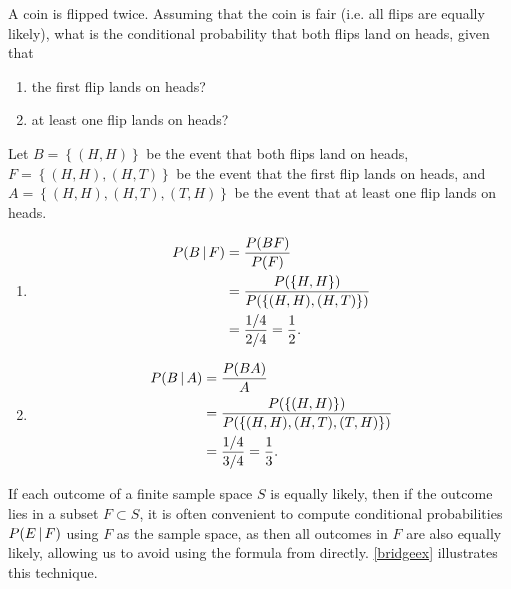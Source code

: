 \begin{changebar}
\begin{example}
    A coin is flipped twice. Assuming that the coin is fair (i.e. all flips are equally likely), what is the conditional probability that both flips land on heads, given that \begin{enumerate}[label=(\alph*)]
        \item the first flip lands on heads?
        \item at least one flip lands on heads?
    \end{enumerate}
\end{example}
\begin{solution}
    Let $B = \left\{ (H, H) \right\}$ be the event that both flips land on heads, $F = \left\{ (H, H), (H, T) \right\}$ be the event that the first flip lands on heads, and $A = \left\{ (H, H), (H, T), (T, H) \right\}$ be the event that at least one flip lands on heads.  
    \begin{enumerate}[label=(\alph*)]
        \item \[
            \begin{aligned}
                P(B \,\vert\, F) &= \frac{P(BF)}{P(F)} \\
                &= \frac{P(\left\{ H, H \right\})}{P(\left\{ (H, H), (H, T) \right\})} \\
                &= \frac{1/4}{2/4} = \frac{1}{2}.
            \end{aligned}    
        \]
        \item \[
            \begin{aligned}
                P(B \,\vert\, A) &= \frac{P(BA)}{A} \\
                &= \frac{P(\left\{ (H, H) \right\})}{P(\left\{ (H, H), (H, T), (T, H) \right\})} \\
                &= \frac{1/4}{3/4} = \frac{1}{3}.
            \end{aligned}    
        \]
    \end{enumerate}
\end{solution}
\end{changebar}

If each outcome of a finite sample space $S$ is equally likely, then if the outcome lies in a subset $F \subset S$, it is often convenient to compute conditional probabilities $P(E \,\vert\, F)$ using $F$ as the sample space, as then all outcomes in $F$ are also equally likely, allowing us to avoid using the formula from  directly. \autoref{bridgeex} illustrates this technique.

